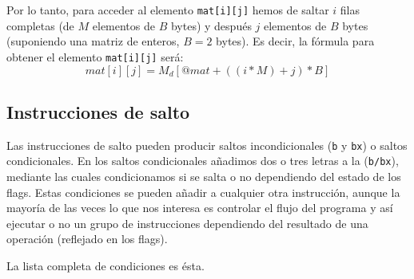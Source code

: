 Por lo tanto, para acceder al elemento {\tt mat[i][j]} hemos de saltar
$i$ filas completas (de $M$ elementos de $B$ bytes) y después $j$
elementos de $B$ bytes (suponiendo una matriz de enteros, $B= 2$ bytes). Es
decir, la fórmula para obtener el elemento {\tt mat[i][j]} será:
\begin{equation}
mat[i][j] = M_d[@mat + ((i*M)+j)*B] 
\label{eq:accesoelemmatriz}
\end{equation}


\subsection{Instrucciones de salto}

Las instrucciones de salto pueden producir saltos incondicionales ({\tt b} y {\tt bx})
o saltos condicionales. En los saltos condicionales añadimos dos o tres letras
a la ({\tt b/bx}), mediante las cuales condicionamos si se salta o no dependiendo
del estado de los flags. Estas condiciones se pueden añadir a cualquier
otra instrucción, aunque la mayoría de las veces lo que nos interesa es controlar
el flujo del programa y así ejecutar o no un grupo de instrucciones dependiendo
del resultado de una operación (reflejado en los flags).

La lista completa de condiciones es ésta.

